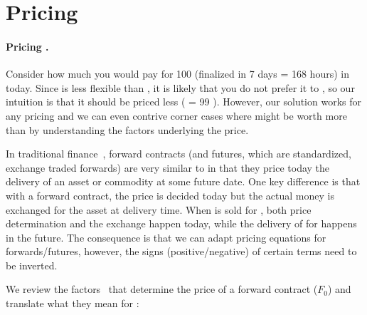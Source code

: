 

\section{Pricing}  
\label{sec:pricing}

\paragraph*{Pricing \ethxx.}

Consider how much you would pay for 100 \ethxx (finalized in 7 days = 168 hours) in \ethone today. Since \ethxx is less flexible than \ethone, it is likely that you do not prefer it to \ethone, so our intuition is that it should be priced less ( \ethxx = 99 \ethone). However, our solution works for any pricing and we can even contrive corner cases where \ethxx might be worth more than \ethone by understanding the factors underlying the price. 

In traditional finance~\cite{hull2013fundamentals}, forward contracts (and futures, which are standardized, exchange traded forwards) are very similar to \ethxx in that they price today the delivery of an asset or commodity at some future date. One key difference is that with a forward contract, the price is decided today but the actual money is exchanged for the asset at delivery time. When \ethxx is sold for \ethone, both price determination and the exchange happen today, while the delivery of \ethone for \ethxx happens in the future. The consequence is that we can adapt pricing equations for forwards/futures, however, the signs (positive/negative) of certain terms need to be inverted. 

We review the factors~\cite{hull2013fundamentals} that determine the price of a forward contract ($F_0$) and translate what they mean for \ethxx:

